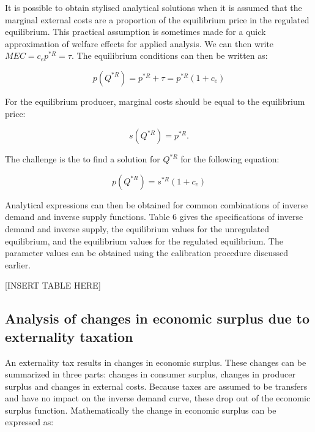 \documentclass[
]{book}
\begin{document}
It is possible to obtain stylised analytical solutions when it is assumed that the marginal external costs are a proportion of the equilibrium price in the regulated equilibrium. This practical assumption is sometimes made for a quick approximation of welfare effects for applied analysis. We can then write \(MEC=c_e p^{*R}=\tau\). The equilibrium conditions can then be written as:

\begin{equation}
p(Q^{* R}) = p^{* R} + \tau = p^{* R} (1 + c_e)
\end{equation}

For the equilibrium producer, marginal costs should be equal to the equilibrium price:

\begin{equation}
s(Q^{* R} )=p^{* R}.
\end{equation}

The challenge is the to find a solution for \(Q^{* R}\) for the following equation:

\begin{equation}
p(Q^{* R}) = s^{* R} (1 + c_e)
\end{equation}

Analytical expressions can then be obtained for common combinations of inverse demand and inverse supply functions. Table 6 gives the specifications of inverse demand and inverse supply, the equilibrium values for the unregulated equilibrium, and the equilibrium values for the regulated equilibrium. The parameter values can be obtained using the calibration procedure discussed earlier.

{[}INSERT TABLE HERE{]}

\hypertarget{analysis-of-changes-in-economic-surplus-due-to-externality-taxation}{%
\subsection{Analysis of changes in economic surplus due to externality taxation}\label{analysis-of-changes-in-economic-surplus-due-to-externality-taxation}}

An externality tax results in changes in economic surplus. These changes can be summarized in three parts: changes in consumer surplus, changes in producer surplus and changes in external costs. Because taxes are assumed to be transfers and have no impact on the inverse demand curve, these drop out of the economic surplus function. Mathematically the change in economic surplus can be expressed as:
\end{document}
